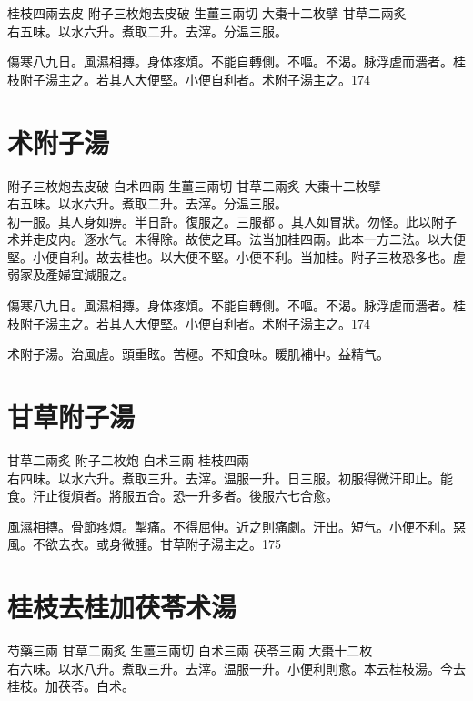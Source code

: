桂枝{\scriptsize 四兩去皮} 附子{\scriptsize 三枚炮去皮破} 生薑{\scriptsize 三兩切} 大棗{\scriptsize 十二枚擘} 甘草{\scriptsize 二兩炙}\\
右五味。以水六升。煮取二升。去滓。分温三服。

傷寒八九日。風濕相摶。身体疼煩。不能自轉側。不嘔。不渴。脉浮虗而濇者。桂枝附子湯主之。若其人大便堅。小便自利者。术附子湯主之。174

\section{术附子湯}

附子{\scriptsize 三枚炮去皮破} 白术{\scriptsize 四兩} 生薑{\scriptsize 三兩切} 甘草{\scriptsize 二兩炙} 大棗{\scriptsize 十二枚擘}\\
右五味。以水六升。煮取二升。去滓。分温三服。\\
初一服。其人身如痹。半日許。復服之。三服都{\sungtpii 𥁞}。其人如冒狀。勿怪。此以附子术并走皮内。逐水气。未得除。故使之耳。法当加桂四兩。此本一方二法。以大便堅。小便自利。故去桂也。以大便不堅。小便不利。当加桂。附子三枚恐多也。虗弱家及產婦宜減服之。

傷寒八九日。風濕相摶。身体疼煩。不能自轉側。不嘔。不渴。脉浮虗而濇者。桂枝附子湯主之。若其人大便堅。小便自利者。术附子湯主之。174

术附子湯。治風虗。頭重眩。苦極。不知食味。暖肌補中。益精气。

\section{甘草附子湯}

甘草{\scriptsize 二兩炙} 附子{\scriptsize 二枚炮} 白术{\scriptsize 三兩} 桂枝{\scriptsize 四兩}\\ 
右四味。以水六升。煮取三升。去滓。温服一升。日三服。初服得微汗即止。能食。汗止復煩者。將服五合。恐一升多者。後服六七合愈。

風濕相摶。骨節疼煩。掣痛。不得屈伸。近之則痛劇。汗出。短气。小便不利。惡風。不欲去衣。或身微腫。甘草附子湯主之。175

\section{桂枝去桂加茯苓术湯}

芍藥{\scriptsize 三兩} 甘草{\scriptsize 二兩炙} 生薑{\scriptsize 三兩切} 白术{\scriptsize 三兩} 茯苓{\scriptsize 三兩} 大棗{\scriptsize 十二枚}\\
右六味。以水八升。煮取三升。去滓。温服一升。小便利則愈。本云桂枝湯。今去桂枝。加茯苓。白术。

